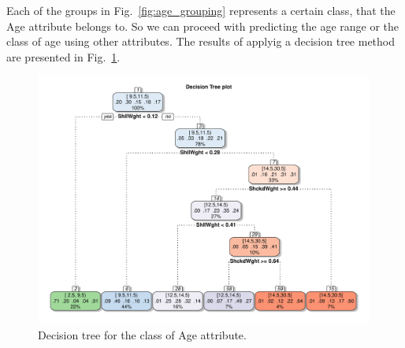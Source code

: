 \documentclass[10pt, paper=a4]{article}
\begin{document}
Each of the groups in Fig.~\ref{fig:age_grouping} represents a certain
class, that the Age attribute belongs to.  So we can proceed with
predicting the age range or the class of age using other attributes.
The results of applyig a decision tree method are presented in
Fig.~\ref{fig:decision_tree}.


\begin{figure}[htbp]
  \centering
  \includegraphics[width = 0.99\textwidth]{decision_tree.pdf}
  \caption{Decision tree for the class of Age attribute.}
  \label{fig:decision_tree}
\end{figure}




\end{document}
